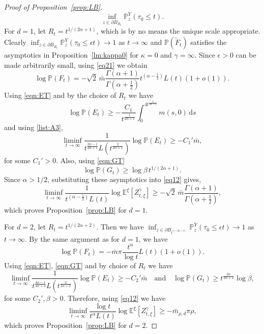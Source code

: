 \documentclass{article}[12pt]
\theoremstyle{definition}
\newcommand{\1}{\mathbbm{1}}
\newcommand{\dd }{\mathrm{d} }
\begin{document}
\begin{proof}[Proof of Proposition~\ref{prop:LB}]
\begin{equation}
{\inf_{z \in \partial B_{R_t}}\mathbb{P}^Y_z(\tau_0 \leq t)}.
\label{eq21}
\end{equation}
For $d = 1$, let $R_t = t^{1/(2\alpha+1)}$, which is by no means the unique scale appropriate. Clearly $\inf_{z \in \partial B_{R_t}} \mathbb{P}^Y_z(\tau_0 \leq \epsilon t) \to 1$ as $t \to \infty$ and  $\mathbb{P}(\tilde{F}_t)$ satisfies the asymptotics in Proposition~\ref{lm:kappa0} for $\kappa = 0$ and $\gamma = \infty$. Since $\epsilon >0$ can be made arbitrarily small, using \eqref{eq21} we obtain
$$
\log \mathbb{P}(F_t) = -  \sqrt{2}\, \bar{m} \frac{\Gamma(\alpha+1)}{\Gamma(\alpha+\frac{1}{2}
        )}t^{(\alpha-\frac{1}{2})}L(t)(1+o(1)).
$$
Using \eqref{eqn:ET} and by the choice of $R_t$ we have
$$
\log \mathbb{P}(E_t) \ge  -\frac{C_1}{t^{\frac{1}{2\alpha+1}}}\int_0^{4 t^{\frac{2}{2\alpha +1}}} m(s,0)\, \dd s 
$$
and using \ref{list:A3},
$$
\liminf_{t\to \infty}  \frac{1}{t^{\frac{2\alpha-1}{2\alpha+1}} L(t^{\frac{2}{2\alpha+1}})}\log \mathbb{P}(E_t) \ge - C_1' \bar{m} ,
$$
for some $C_1'>0$.
Also, using \eqref{eqn:GT}
$$
\log \mathbb{P}(G_t) \geq \log \beta \, t^{1/(2\alpha+1)}.
$$
Since $\alpha> 1/2$, substituting these asymptotics into \eqref{eq12} gives,
\begin{equation*}
\liminf_{t\to \infty}\frac{1}{t^{(\alpha-\frac{1}{2})}L(t)}\log \mathbb{E}^\xi [Z^\gamma_{t, \xi}] \ge -  \sqrt{2}\, \bar{m}\frac{\Gamma(\alpha+1)}{\Gamma(\alpha+\frac{1}{2}
        )},
\end{equation*}
which proves Proposition~\ref{prop:LB} for $d=1$.

For $d = 2$, let $R_t = t^{1/(2\alpha+2)}$. Then we have $\inf_{z \in \partial B_{t^{1/(2\alpha+2)}}} \mathbb{P}^Y_z(\tau_0 \leq \epsilon t) \to 1$ as $t \to \infty$. By the same argument as for $d = 1$, we have
$$
\log \mathbb{P}(F_t) =  -\bar{m} \pi \frac{t^\alpha}{\log t} L(t) (1 + o(1)).
$$
Using \eqref{eqn:ET}, \eqref{eqn:GT} and by choice of $R_t$ we have
$$
\liminf_{t\to\infty} \frac{1}{t^{\frac{4\alpha-1}{4\alpha+4}}L(t^{\frac{2}{2\alpha +2}})}\log \mathbb{P}(E_t) \ge -C_2' \bar{m} \quad \text{and} \quad \log \mathbb{P}(G_t) \geq t^{\frac{2\alpha}{2\alpha+2}} \log \beta,
$$
for some $C_2', \beta >0$.
Therefore, using \eqref{eq12} we have
\begin{equation*}
\liminf_{t\to \infty}\frac{\log t}{t^{\alpha}L(t)}\log \mathbb{E}^\xi [Z^\gamma_{t, \xi}] \ge - \bar{m}_{\rho,d} \pi \rho,
\end{equation*}
which proves Proposition~\ref{prop:LB} for $d=2$.
\end{proof}
\end{document}
